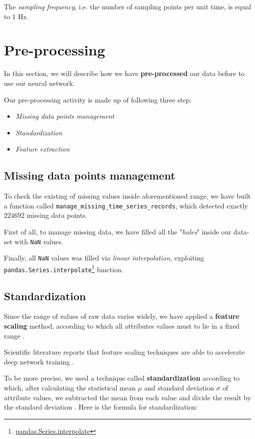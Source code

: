 \documentclass[sigconf]{acmart}
\begin{document}
The \textit{sampling frequency}, i.e. the number of sampling points per unit time, is equal to $1$ Hz.

\section{Pre-processing}

In this section, we will describe how we have \textbf{pre-processed} our data before to use our neural network.

Our pre-processing activity is made up of following three step:

\begin{itemize}
\item \textit{Missing data points management}
\item \textit{Standardization}
\item \textit{Feature extraction}
\end{itemize}

\subsection{Missing data points management}

To check the existing of missing values inside aforementioned range, we have built a function called \texttt{manage\_\-mis\-sing\-\_time\_se\-ries\-\_re\-cords}, which detected exactly $224692$ missing data points. 

First of all, to manage missing data, we have filled all the "\textit{holes}" inside our data-set with \texttt{NaN} values. 

Finally, all \texttt{NaN} values was filled via \textit{linear interpolation,} exploiting \texttt{pan\-das\-.Series\-.interpolate}\footnote{\url{pandas.Series.interpolate}} function.

\subsection{Standardization}

Since the range of values of raw data varies widely, we have applied a \textbf{feature scaling} method, according to which all attributes values must to lie in a fixed range \cite{FalessiDataMining}. 

Scientific literature reports that feature scaling techniques are able to accelerate deep network training \cite{Normalization}\cite{FalessiDataMining}.

To be more precise, we used a technique called \textbf{standardization} according to which, after calculating the statistical mean $\mu$ and standard deviation $\sigma$ of attribute values, we subtracted the mean from each value and divide the result by the standard deviation \cite{FalessiDataMining}. Here is the formula for standardization:
\end{document}
